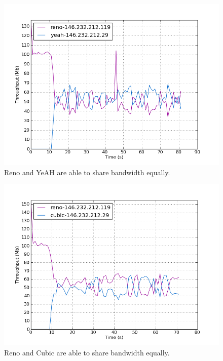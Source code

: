 \documentclass[11pt,a4paper,twocolumn]{article}
\begin{document}
\begin{figure}[p]
	\includegraphics[width=\linewidth]{exp53.png}
	\caption{Reno and YeAH are able to share bandwidth equally.}
	\label{fig:reno_yeah}
\end{figure}

\begin{figure}[p]
	\includegraphics[width=\linewidth]{exp54.png}
	\caption{Reno and Cubic are able to share bandwidth equally.}
	\label{fig:reno_cubic}
\end{figure}
\end{document}
